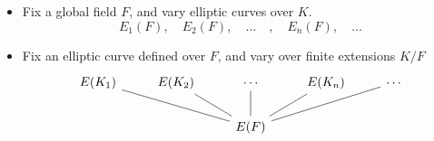 \begin{frame}
\end{frame}





\begin{frame}
\begin{itemize}
\item Fix a global field $F$, and vary elliptic curves over $K$.
	\[
	E_1(F), \quad E_2(F), \quad \ldots \quad , \quad E_n(F), \quad \ldots
	\] \pspace

\item Fix an elliptic curve defined over $F$, and vary over finite extensions $K/F$
	\[
	\begin{tikzcd}[ampersand replacement=\&]
	E(K_1) \& E(K_2) \& \cdots \& E(K_n) \& \cdots \\
	\& \& E(F) \arrow[dash]{ull} \arrow[dash]{ul} \arrow[dash]{u} \arrow[dash]{ur} \arrow[dash]{urr} \& \& 
	\end{tikzcd}
	\]
\end{itemize}
\end{frame}





\begin{frame}[plain]
\end{frame}






